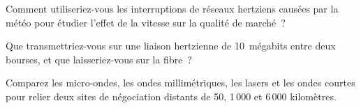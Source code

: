 \begin{interviewq}\label{iq:nw:long-haul-wireless:4}
Comment utiliseriez-vous les interruptions de réseaux hertziens causées par la météo pour étudier l'effet de la vitesse sur la qualité de marché~?
\end{interviewq}

\begin{interviewq}\label{iq:nw:long-haul-wireless:5}
Que transmettriez-vous sur une liaison hertzienne de 10~mégabits entre deux bourses, et que laisseriez-vous sur la fibre~?
\end{interviewq}

\begin{interviewq}\label{iq:nw:long-haul-wireless:6}
Comparez les micro-ondes, les ondes millimétriques, les lasers et les ondes courtes pour relier deux sites de négociation distants de 50, 1\,000 et 6\,000 kilomètres.
\end{interviewq}

